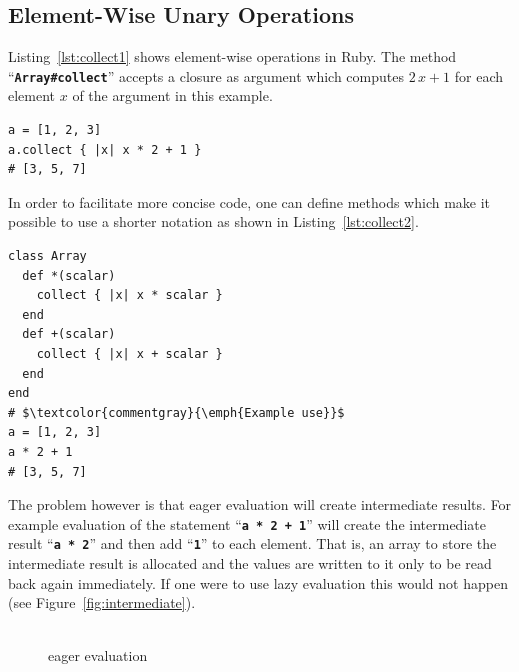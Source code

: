 \documentclass[12pt,a4paper,oneside,openright]{book}
\newcommand{\Eg}{For ex\-am\-ple }
\newcommand{\Ie}{That is, }
\newcommand{\fig}[1]{Figure~\ref{fig:#1}}
\newcommand{\lst}[1]{Listing~\ref{lst:#1}}
\newcommand{\code}[1]{``\texttt{\textbf{\textcolor{codegray}{\small{#1}}}}''}
\begin{document}
\begin{CJK}{UTF8}{}
\subsection{Element-Wise Unary Operations}\label{cha:unary}
\lst{collect1} shows element-wise operations in Ruby. The method \code{Array\#collect} accepts a closure as argument which computes $2\,x+1$ for each element $x$ of the argument in this example.
\lstset{language=Ruby,frame=single,numbers=none}
\begin{lstlisting}[float=htbp,caption={Element-wise unary operations using \code{Array\#collect}},escapechar=\$,label=lst:collect1]
a = [1, 2, 3]
a.collect { |x| x * 2 + 1 }
# [3, 5, 7]
\end{lstlisting}
In order to facilitate more concise code, one can define methods which make it possible to use a shorter notation as shown in \lst{collect2}.
\lstset{language=Ruby,frame=single,numbers=none}
\begin{lstlisting}[float=htbp,caption={Short notation for element-wise operations},escapechar=\$,label=lst:collect2]
class Array
  def *(scalar)
    collect { |x| x * scalar }
  end
  def +(scalar)
    collect { |x| x + scalar }
  end
end
# $\textcolor{commentgray}{\emph{Example use}}$
a = [1, 2, 3]
a * 2 + 1
# [3, 5, 7]
\end{lstlisting}
The problem however is that eager evaluation will create intermediate results. \Eg evaluation of the statement \code{a * 2 + 1} will create the intermediate result \code{a * 2} and then add \code{1} to each element. \Ie an array to store the intermediate result is allocated and the values are written to it only to be read back again immediately. If one were to use lazy evaluation this would not happen (see \fig{intermediate}).
\begin{figure}[htbp]
   \begin{center}
     \begin{minipage}[t]{.336940298507463\textwidth} %
       \begin{center}
         \\
         eager evaluation
       \end{center}

\end{minipage}
\end{center}
\end{figure}
\end{CJK}
\end{document}
